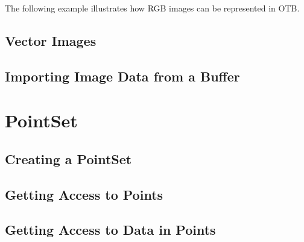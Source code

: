 The following example illustrates how RGB images can be represented in OTB.

\label{sec:DefiningRGBImages}



\subsection{Vector Images}
\label{sec:DefiningVectorImages}




\subsection{Importing Image Data from a Buffer}
\label{sec:ImportingImageDataFromABuffer}




\section{PointSet}
\label{sec:PointSetSection}

\subsection{Creating a PointSet}
\label{sec:CreatingAPointSet}





\subsection{Getting Access to Points}
\label{sec:GettingAccessToPointsInThePointSet}





\subsection{Getting Access to Data in Points}
\label{sec:GettingAccessToDataInThePointSet}






%




